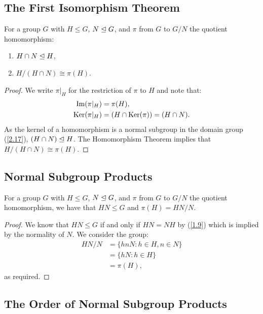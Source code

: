 \newpage

\subsection{The First Isomorphism Theorem} \label{2.22} 

For a group $G$ with $H \leq G$, $N \trianglelefteq G$, and $\pi$ from $G$ to 
$G / N$ the quotient homomorphism: \begin{enumerate}
    \item $H \cap N \trianglelefteq H$,
    \item $H/(H \cap N) \cong \pi(H)$.
\end{enumerate}


\begin{proof}
    We write $\pi|_H$ for the restriction of $\pi$ to $H$
    and note that: \begin{align*}
        \operatorname{Im}(\pi|_H) &= \pi(H), \\
        \operatorname{Ker}(\pi|_H) &= (H \cap \operatorname{Ker}(\pi)) = (H \cap N).
    \end{align*} As the kernel of a homomorphism
    is a normal subgroup in the domain group (\ref{2.17}), \linebreak $(H \cap N) \trianglelefteq H$.
    The Homomorphism Theorem implies that $H / (H \cap N) \cong \pi(H)$.
\end{proof}

\subsection{Normal Subgroup Products} \label{2.23}

For a group $G$ with $H \leq G$, $N \trianglelefteq G$, and $\pi$ from $G$ to 
$G / N$ the quotient homomorphism, we have that 
$HN \leq G$ and $\pi(H) = HN/N$.
\begin{proof}
    We know that $HN \leq G$ if and only if $HN = NH$ by (\ref{1.9})
    which is implied by the normality of $N$.
    We consider the group: \begin{align*}
        HN / N 
        &= \{hnN : h \in H, n \in N\} \\
        &= \{hN : h \in H\} \\
        &= \pi(H),
    \end{align*} as required.
\end{proof} 

\subsection{The Order of Normal Subgroup Products} \label{2.24}

